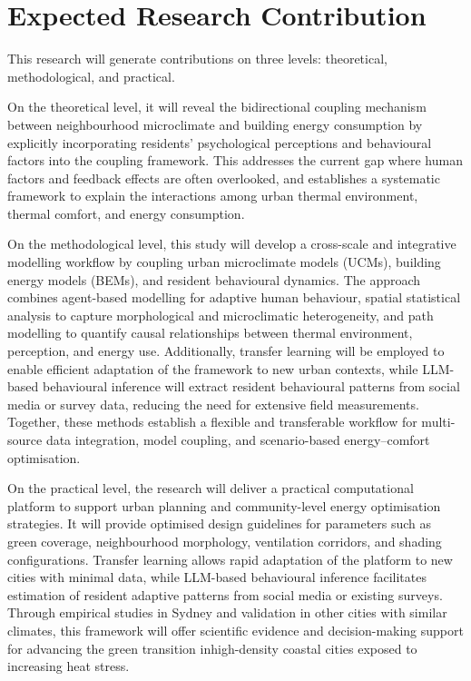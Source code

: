 \section{Expected Research Contribution}

This research will generate contributions on three levels: theoretical, methodological, and practical.

On the theoretical level, it will reveal the bidirectional coupling mechanism between neighbourhood microclimate and building energy consumption by explicitly incorporating residents' psychological perceptions and behavioural factors into the coupling framework. This addresses the current gap where human factors and feedback effects are often overlooked, and establishes a systematic framework to explain the interactions among urban thermal environment, thermal comfort, and energy consumption.

On the methodological level, this study will develop a cross-scale and integrative modelling workflow by coupling urban microclimate models (UCMs), building energy models (BEMs), and resident behavioural dynamics. The approach combines agent-based modelling for adaptive human behaviour, spatial statistical analysis to capture morphological and microclimatic heterogeneity, and path modelling to quantify causal relationships between thermal environment, perception, and energy use. Additionally, transfer learning will be employed to enable efficient adaptation of the framework to new urban contexts, while LLM-based behavioural inference will extract resident behavioural patterns from social media or survey data, reducing the need for extensive field measurements. Together, these methods establish a flexible and transferable workflow for multi-source data integration, model coupling, and scenario-based energy--comfort optimisation.

On the practical level, the research will deliver a practical computational platform to support urban planning and community-level energy optimisation strategies. It will provide optimised design guidelines for parameters such as green coverage, neighbourhood morphology, ventilation corridors, and shading configurations. Transfer learning allows rapid adaptation of the platform to new cities with minimal data, while LLM-based behavioural inference facilitates estimation of resident adaptive patterns from social media or existing surveys. Through empirical studies in Sydney and validation in other cities with similar climates, this framework will offer scientific evidence and decision-making support for advancing the green transition inhigh-density coastal cities exposed to increasing heat stress.
